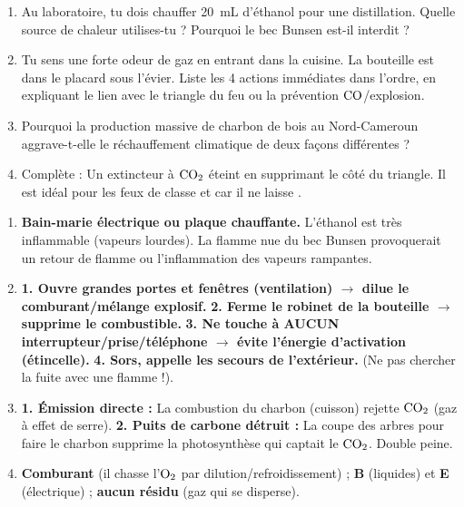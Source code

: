\documentclass[11pt]{article}
\begin{document}
\begin{exercice}
\begin{enumerate}
    \item Au laboratoire, tu dois chauffer \SI{20}{mL} d'éthanol pour une distillation. Quelle source de chaleur utilises-tu ? Pourquoi le bec Bunsen est-il interdit ?
    \item Tu sens une forte odeur de gaz en entrant dans la cuisine. La bouteille est dans le placard sous l'évier. Liste les 4 actions immédiates dans l'ordre, en expliquant le lien avec le triangle du feu ou la prévention $\ce{CO}$/explosion.
    \item Pourquoi la production massive de charbon de bois au Nord-Cameroun aggrave-t-elle le réchauffement climatique de deux façons différentes ?
    \item Complète : Un extincteur à $\ce{CO2}$ éteint en supprimant le côté \underline{\hspace{3cm}} du triangle. Il est idéal pour les feux de classe \underline{\hspace{2cm}} et \underline{\hspace{2cm}} car il ne laisse \underline{\hspace{3cm}}.
\end{enumerate}
\end{exercice}

\begin{corrige}
\begin{enumerate}
    \item \textbf{Bain-marie électrique ou plaque chauffante.} L'éthanol est très inflammable (vapeurs lourdes). La flamme nue du bec Bunsen provoquerait un retour de flamme ou l'inflammation des vapeurs rampantes.
    \item \textbf{1. Ouvre grandes portes et fenêtres (ventilation) $\to$ dilue le comburant/mélange explosif.} \textbf{2. Ferme le robinet de la bouteille $\to$ supprime le combustible.} \textbf{3. Ne touche à AUCUN interrupteur/prise/téléphone $\to$ évite l'énergie d'activation (étincelle).} \textbf{4. Sors, appelle les secours de l'extérieur.} (Ne pas chercher la fuite avec une flamme !).
    \item \textbf{1. Émission directe :} La combustion du charbon (cuisson) rejette $\ce{CO2}$ (gaz à effet de serre). \textbf{2. Puits de carbone détruit :} La coupe des arbres pour faire le charbon supprime la photosynthèse qui captait le $\ce{CO2}$. Double peine.
    \item \textbf{Comburant} (il chasse l'$\ce{O2}$ par dilution/refroidissement) ; \textbf{B} (liquides) et \textbf{E} (électrique) ; \textbf{aucun résidu} (gaz qui se disperse).
\end{enumerate}
\end{corrige}
\end{document}
